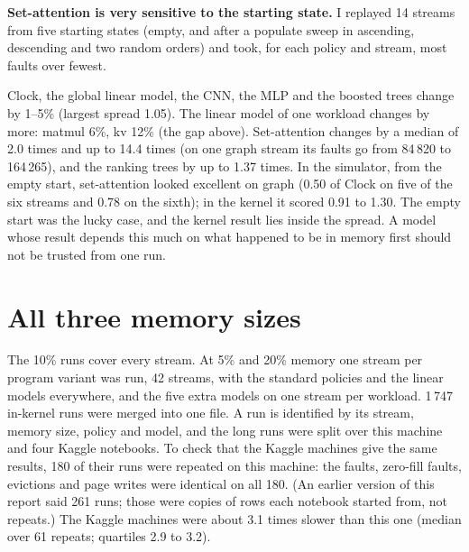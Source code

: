 \documentclass[10.5pt,a4paper]{article}
\begin{document}
\textbf{Set-attention is very sensitive to the starting state.} I replayed 14 streams from five starting states (empty, and after a
populate sweep in ascending, descending and two random orders) and took, for each policy and stream, most faults over fewest.

\begin{table}[h]
\centering\small

\caption{Spread of simulated faults over five starting states: median and largest over streams. 1.00 means the starting state does not matter.}
\end{table}

Clock, the global linear model, the CNN, the MLP and the boosted trees change by 1--5\% (largest spread 1.05). The linear model of one workload changes by
more: matmul 6\%, kv 12\% (the gap above). Set-attention changes by a median of 2.0 times and up to 14.4 times (on one graph
stream its faults go from 84\,820 to 164\,265), and the ranking trees by up to 1.37 times. In the simulator, from the empty start, set-attention looked excellent
on graph (0.50 of Clock on five of the six streams and 0.78 on the sixth); in the kernel it scored 0.91 to 1.30. The empty start was the lucky case, and the kernel
result lies inside the spread. A model whose result depends this much on what happened
to be in memory first should not be trusted from one run.

\section{All three memory sizes}
\label{sec:sizes}

The 10\% runs cover every stream. At 5\% and 20\% memory one stream per program variant was run, 42 streams, with the standard policies and the linear models
everywhere, and the five extra models on one stream per workload. 1\,747 in-kernel runs were merged into one file. A run is identified by its stream, memory
size, policy and model, and the long runs were split over this machine and four Kaggle notebooks. To check that the Kaggle machines give the same results, 180 of their runs were repeated on this machine: the
faults, zero-fill faults, evictions and page writes were identical on all 180. (An earlier version of this report said 261 runs; those were copies of rows each notebook started from, not repeats.)
The Kaggle machines were about 3.1 times slower than this one (median over 61 repeats; quartiles 2.9 to 3.2).

\begin{table}[h]
\centering\scriptsize

\caption{5\% memory. Faults relative to Clock in xv6. Every row of a column averages the same streams (those the extra models were run on).
The extra models were trained on kv or graph only, so their other columns show how they carry over. A dash: not run.}
\label{tab:full}
\end{table}
\end{document}
